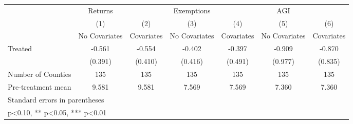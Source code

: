 {
\def\sym#1{\ifmmode^{#1}\else\(^{#1}\)\fi}
\begin{tabular}{l*{6}{c}}
\hline\hline
            &     Returns   &               &  Exemptions   &               &         AGI   &               \\
            &\multicolumn{1}{c}{(1)}&\multicolumn{1}{c}{(2)}&\multicolumn{1}{c}{(3)}&\multicolumn{1}{c}{(4)}&\multicolumn{1}{c}{(5)}&\multicolumn{1}{c}{(6)}\\
            &\multicolumn{1}{c}{No Covariates}&\multicolumn{1}{c}{Covariates}&\multicolumn{1}{c}{No Covariates}&\multicolumn{1}{c}{Covariates}&\multicolumn{1}{c}{No Covariates}&\multicolumn{1}{c}{Covariates}\\
\hline
Treated     &      -0.561   &      -0.554   &      -0.402   &      -0.397   &      -0.909   &      -0.870   \\
            &     (0.391)   &     (0.410)   &     (0.416)   &     (0.491)   &     (0.977)   &     (0.835)   \\
\hline
Number of Counties&         135   &         135   &         135   &         135   &         135   &         135   \\
Pre-treatment mean&       9.581   &       9.581   &       7.569   &       7.569   &       7.360   &       7.360   \\
\hline\hline
\multicolumn{7}{l}{\footnotesize Standard errors in parentheses}\\
\multicolumn{7}{l}{\footnotesize * p<0.10, ** p<0.05, *** p<0.01}\\
\end{tabular}
}
